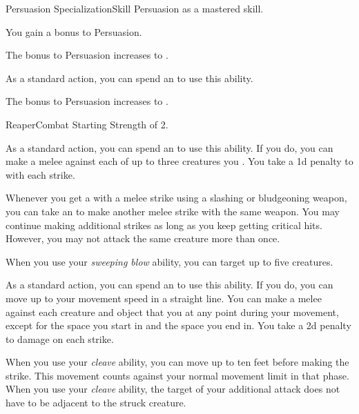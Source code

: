    \begin{feat}{Persuasion Specialization}{Skill}
        \featpre Persuasion as a mastered skill.
        \featben

         You gain a  bonus to Persuasion.

        \ff[2]{}

         The bonus to Persuasion increases to .

         As a standard action, you can spend an  to use this ability.

         The bonus to Persuasion increases to .
    \end{feat}

    \begin{feat}{Reaper}{Combat}
        \featpre Starting Strength of 2.

         As a standard action, you can spend an  to use this ability.
        If you do, you can make a melee  against each of up to three creatures you .
        You take a \minus1d penalty to  with each strike.

         Whenever you get a  with a melee strike using a slashing or bludgeoning weapon, you can take an  to make another melee strike with the same weapon.
        You may continue making additional strikes as long as you keep getting critical hits.
        However, you may not attack the same creature more than once.

         When you use your \textit{sweeping blow} ability, you can target up to five creatures.

         As a standard action, you can spend an  to use this ability.
        If you do, you can move up to your movement speed in a straight line.
        You can make a melee  against each creature and object that you  at any point during your movement, except for the space you start in and the space you end in.
        You take a \minus2d penalty to damage on each strike.

         When you use your \textit{cleave} ability, you can move up to ten feet before making the strike.
        This movement counts against your normal movement limit in that phase.
        When you use your \textit{cleave} ability, the target of your additional attack does not have to be adjacent to the struck creature.


\end{feat}
